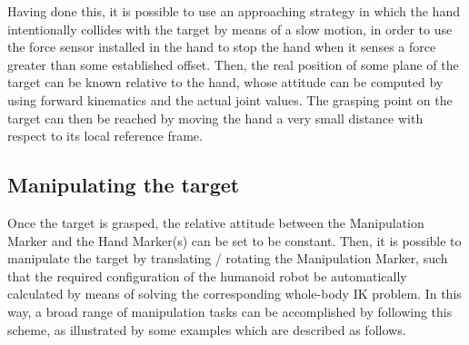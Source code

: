 		Having done this, it is possible to use an approaching strategy in which the hand intentionally collides with
		the target by means of a slow motion, in order to use the force sensor installed in the hand to stop the hand
		when it senses a force greater than some established offset.
		Then, the real position of some plane of the target can be known relative to the hand, whose attitude can be
		computed by using forward kinematics and the actual joint values.
		The grasping point on the target can then be reached by moving the hand a very small distance with respect
		to its local reference frame.
		
	\subsection{Manipulating the target}
		
		Once the target is grasped, the relative attitude between the Manipulation Marker and the Hand Marker(s) can be
		set to be constant.
		Then, it is possible to manipulate the target by translating / rotating the Manipulation Marker, such that the
		required configuration of the humanoid robot be automatically calculated by means of solving the corresponding
		whole-body IK problem.
		In this way, a broad range of manipulation tasks can be accomplished by following this scheme, as illustrated
		by some examples which are described as follows.